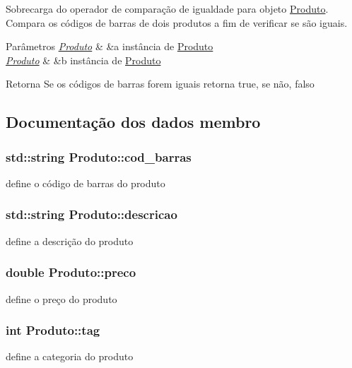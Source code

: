 Sobrecarga do operador de comparação de igualdade para objeto \hyperlink{classProduto}{Produto}.  Compara os códigos de barras de dois produtos a fim de verificar se são iguais. 


\begin{DoxyParams}{Parâmetros}
{\em \hyperlink{classProduto}{Produto}} & \&a instância de \hyperlink{classProduto}{Produto} \\
\hline
{\em \hyperlink{classProduto}{Produto}} & \&b instância de \hyperlink{classProduto}{Produto} \\
\hline
\end{DoxyParams}
\begin{DoxyReturn}{Retorna}
Se os códigos de barras forem iguais retorna true, se não, falso 
\end{DoxyReturn}


\subsection{Documentação dos dados membro}
\hypertarget{classProduto_a81dc2fcc260450b37524278699094f0b}{
\subsubsection[{cod\-\_\-barras}]{\setlength{\rightskip}{0pt plus 5cm}std\-::string Produto\-::cod\-\_\-barras\hspace{0.3cm}{\ttfamily [protected]}}}\label{classProduto_a81dc2fcc260450b37524278699094f0b}
define o código de barras do produto \hypertarget{classProduto_ab04a024e24feb7f79774e280356f6bc7}{
\subsubsection[{descricao}]{\setlength{\rightskip}{0pt plus 5cm}std\-::string Produto\-::descricao\hspace{0.3cm}{\ttfamily [protected]}}}\label{classProduto_ab04a024e24feb7f79774e280356f6bc7}
define a descrição do produto \hypertarget{classProduto_a2ad13f91582fd70e878fc449c7b77171}{
\subsubsection[{preco}]{\setlength{\rightskip}{0pt plus 5cm}double Produto\-::preco\hspace{0.3cm}{\ttfamily [protected]}}}\label{classProduto_a2ad13f91582fd70e878fc449c7b77171}
define o preço do produto \hypertarget{classProduto_a76711f92305c825f07549734cd7c6ade}{
\subsubsection[{tag}]{\setlength{\rightskip}{0pt plus 5cm}int Produto\-::tag\hspace{0.3cm}{\ttfamily [protected]}}}\label{classProduto_a76711f92305c825f07549734cd7c6ade}
define a categoria do produto 

